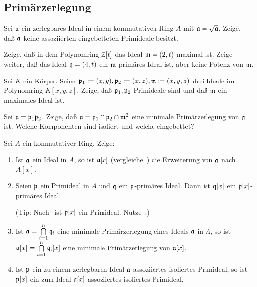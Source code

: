 \subsection{Primärzerlegung}

\begin{exercise}
	Sei \(\mathfrak{a}\) ein zerlegbares Ideal in einem kommutativen Ring
	\(A\) mit \(\mathfrak{a} = \sqrt{\mathfrak{a}}\). Zeige, daß \(\mathfrak{a}\) keine
	assoziierten eingebetteten Primideale besitzt.
\end{exercise}

\begin{exercise}
	Zeige, daß in dem Polynomring \(\mathbb Z[t]\) das Ideal \(\mathfrak{m} = (2, t)\)
	maximal ist. Zeige weiter, daß das Ideal \(\mathfrak{q} = (4, t)\) ein
	\(\mathfrak{m}\)-primäres Ideal ist, aber keine Potenz von \(\mathfrak{m}\).
\end{exercise}

\begin{exercise}
	Sei \(K\) ein Körper. Seien \(\mathfrak{p}_1 \coloneqq (x, y),
	\mathfrak{p}_2 \coloneqq (x, z),
	\mathfrak{m} \coloneqq (x, y, z)\) drei Ideale im Polynomring \(K[x, y, z]\).
	Zeige, daß \(\mathfrak{p}_1, \mathfrak{p}_2\) Primideale sind und daß \(\mathfrak{m}\)
	ein maximales Ideal ist.
	
	Sei \(\mathfrak{a} = \mathfrak{p}_1 \mathfrak{p}_2\). Zeige, daß \(\mathfrak{a} = \mathfrak{p}_1
	\cap \mathfrak{p}_2 \cap \mathfrak{m}^2\) eine minimale Primärzerlegung von
	\(\mathfrak{a}\) ist. Welche Komponenten sind isoliert und welche eingebettet?
\end{exercise}

\begin{exercise}
	\label{exer:primary_in_poly}
	Sei \(A\) ein kommutativer Ring. Zeige:
	\begin{enumerate}
	\item
		Ist \(\mathfrak{a}\) ein Ideal in \(A\), so ist \(\mathfrak{a}[x]\)
		(vergleiche~)
		die Erweiterung von \(\mathfrak{a}\) nach \(A[x]\).
	\item
		Seien \(\mathfrak{p}\) ein Primideal in \(A\) und \(\mathfrak{q}\) ein
		\(\mathfrak{p}\)-primäres Ideal. Dann ist \(\mathfrak{q}[x]\) ein
		\(\mathfrak{p}[x]\)-primäres Ideal.
		
		(Tip: Nach~ ist \(\mathfrak{p}[x]\) ein
		Primideal. Nutze~.)
	\item
		Ist \(\mathfrak{a} = \bigcap\limits_{i = 1}^n \mathfrak{q}_i\) eine minimale
		Primärzerlegung eines Ideals \(\mathfrak{a}\) in \(A\), so ist \(\mathfrak{a}[x]
		= \bigcap\limits_{i = 1}^n \mathfrak{q}_i[x]\) eine minimale Primärzerlegung
		von \(\mathfrak{a}[x]\).
	\item
		Ist \(\mathfrak{p}\) ein zu einem zerlegbaren Ideal \(\mathfrak{a}\)
		assoziiertes isoliertes Primideal, so ist \(\mathfrak{p}[x]\) ein zum Ideal
		\(\mathfrak{a}[x]\) assoziiertes isoliertes Primideal.
	\end{enumerate}
\end{exercise}

